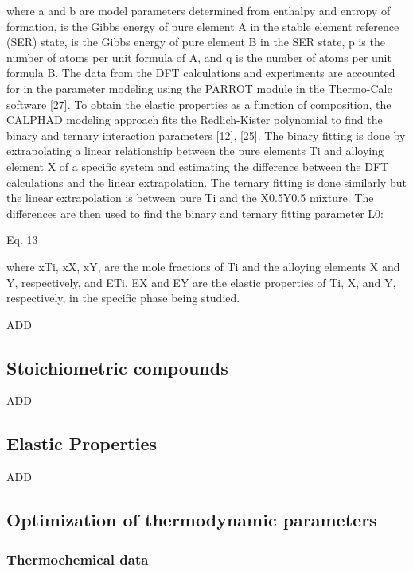 where a and b are model parameters determined from enthalpy and entropy of formation,  is the Gibbs energy of pure element A in the stable element reference (SER) state,   is the Gibbs energy of pure element B in the SER state, p is the number of atoms per unit formula of A, and q is the number of atoms per unit formula B. The data from the DFT calculations and experiments are accounted for in the parameter modeling using the PARROT module in the Thermo-Calc software [27].
To obtain the elastic properties as a function of composition, the CALPHAD modeling approach fits the Redlich-Kister polynomial to find the binary and ternary interaction parameters [12], [25]. The binary fitting is done by extrapolating a linear relationship between the pure elements Ti and alloying element X of a specific system and estimating the difference between the DFT calculations and the linear extrapolation. The ternary fitting is done similarly but the linear extrapolation is between pure Ti and the X0.5Y0.5 mixture. The differences are then used to find the binary and ternary fitting parameter L0: 

Eq. 13

where xTi, xX, xY, are the mole fractions of Ti and the alloying elements X and Y, respectively, and ETi, EX and EY are the elastic properties of Ti, X, and Y, respectively, in the specific phase being studied. 





ADD

\subsection{Stoichiometric compounds}

ADD

\subsection{Elastic Properties}

ADD

\subsection{Optimization of thermodynamic parameters}

\subsubsection{Thermochemical data}

